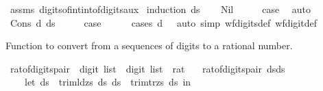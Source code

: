 \begin{isabellebody}
\isamarkupfalse%
\ assms\ digits{\isacharunderscore}{\kern0pt}of{\isacharunderscore}{\kern0pt}int{\isacharunderscore}{\kern0pt}int{\isacharunderscore}{\kern0pt}of{\isacharunderscore}{\kern0pt}digits{\isacharunderscore}{\kern0pt}aux\isanewline
{}\isamarkupfalse%
\ {\isacharparenleft}{\kern0pt}induction\ ds{\isacharparenright}{\kern0pt}\isanewline
\ \ \isamarkupfalse%
\ Nil\isanewline
\ \ \isamarkupfalse%
\ \isamarkupfalse%
\ {\isacharquery}{\kern0pt}case\ \isamarkupfalse%
\ auto\isanewline
{}\isamarkupfalse%
\isanewline
\ \ \isamarkupfalse%
\ {\isacharparenleft}{\kern0pt}Cons\ d\ ds{\isacharparenright}{\kern0pt}\isanewline
\ \ \isamarkupfalse%
\ \isamarkupfalse%
\ {\isacharquery}{\kern0pt}case\isanewline
\ \ \ \ \isamarkupfalse%
\ {\isacharparenleft}{\kern0pt}cases\ {\isachardoublequoteopen}d\ {\isacharequal}{\kern0pt}\ {}{\isachardoublequoteclose}{\isacharparenright}{\kern0pt}\ {\isacharparenleft}{\kern0pt}auto\ simp{\isacharcolon}{\kern0pt}\ wf{\isacharunderscore}{\kern0pt}digits{\isacharunderscore}{\kern0pt}def\ wf{\isacharunderscore}{\kern0pt}digit{\isacharunderscore}{\kern0pt}def{\isacharparenright}{\kern0pt}\isanewline
{}\isamarkupfalse%
%
\endisatagproof
{\isafoldproof}%
%
\isadelimproof
%
\endisadelimproof
%
\begin{isamarkuptext}%
Function to convert from a sequences of digits to a rational number.%
\end{isamarkuptext}\isamarkuptrue%
\isamarkupfalse%
\ rat{\isacharunderscore}{\kern0pt}of{\isacharunderscore}{\kern0pt}digits{\isacharunderscore}{\kern0pt}pair\ {\isacharcolon}{\kern0pt}{\isacharcolon}{\kern0pt}\ {\isachardoublequoteopen}digit\ list\ {\isasymtimes}\ digit\ list\ {\isasymRightarrow}\ rat{\isachardoublequoteclose}\ \isanewline
\ \ {\isachardoublequoteopen}rat{\isacharunderscore}{\kern0pt}of{\isacharunderscore}{\kern0pt}digits{\isacharunderscore}{\kern0pt}pair\ {\isacharparenleft}{\kern0pt}dsds\ {\isacharequal}{\kern0pt}\ {\isacharparenleft}{\kern0pt}\isanewline
\ \ \ \ let\ ds\ {\isacharequal}{\kern0pt}\ trim{\isacharunderscore}{\kern0pt}ld{\isacharunderscore}{\kern0pt}zs\ ds\ ds\ {\isacharequal}{\kern0pt}\ trim{\isacharunderscore}{\kern0pt}tr{\isacharunderscore}{\kern0pt}zs\ ds\ in\isanewline

\end{isabellebody}
